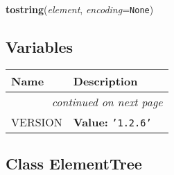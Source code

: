     \label{xml:etree:ElementTree:tostring}

    \vspace{0.5ex}

\hspace{.8\funcindent}\begin{boxedminipage}{\funcwidth}

    \raggedright \textbf{tostring}(\textit{element}, \textit{encoding}={\tt None})

\setlength{\parskip}{2ex}
\setlength{\parskip}{1ex}
    \end{boxedminipage}



  \subsection{Variables}

    \vspace{-1cm}
\hspace{\varindent}\begin{longtable}{|p{\varnamewidth}|p{\vardescrwidth}|l}
\cline{1-2}
\cline{1-2} \centering \textbf{Name} & \centering \textbf{Description}& \\
\cline{1-2}
\endhead\cline{1-2}\multicolumn{3}{r}{\small\textit{continued on next page}}\\\endfoot\cline{1-2}
\endlastfoot\raggedright V\-E\-R\-S\-I\-O\-N\- & \raggedright \textbf{Value:} 
{\tt \texttt{'}\texttt{1.2.6}\texttt{'}}&\\
\cline{1-2}
\end{longtable}



\subsection{Class ElementTree}

    \label{xml:etree:ElementTree:ElementTree}


